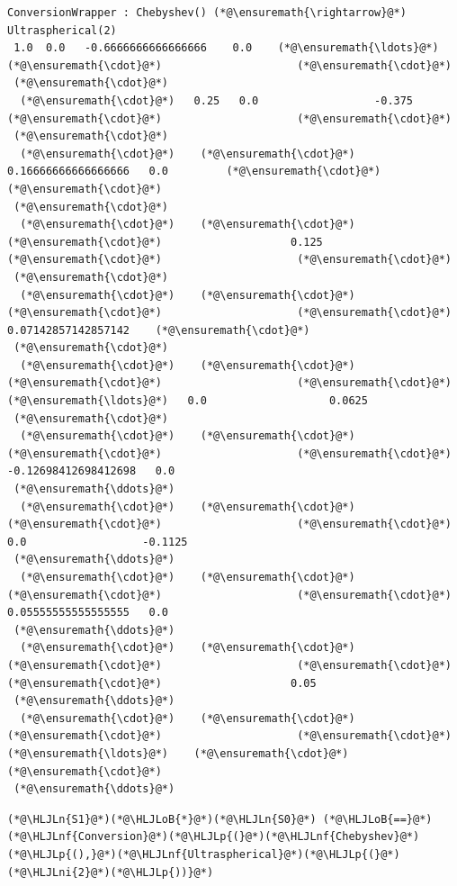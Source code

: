 \documentclass[12pt,a4paper]{article}
\newcommand{\HLJLn}[1]{#1}
\newcommand{\HLJLnf}[1]{\textcolor[RGB]{66,102,213}{#1}}
\newcommand{\HLJLni}[1]{\textcolor[RGB]{59,151,46}{#1}}
\newcommand{\HLJLoB}[1]{\textcolor[RGB]{102,102,102}{\textbf{#1}}}
\newcommand{\HLJLp}[1]{#1}
\begin{document}
\begin{lstlisting}
ConversionWrapper : Chebyshev() (*@\ensuremath{\rightarrow}@*) Ultraspherical(2)
 1.0  0.0   -0.6666666666666666    0.0    (*@\ensuremath{\ldots}@*)    (*@\ensuremath{\cdot}@*)                     (*@\ensuremath{\cdot}@*)     
 (*@\ensuremath{\cdot}@*)
  (*@\ensuremath{\cdot}@*)   0.25   0.0                  -0.375       (*@\ensuremath{\cdot}@*)                     (*@\ensuremath{\cdot}@*)     
 (*@\ensuremath{\cdot}@*)
  (*@\ensuremath{\cdot}@*)    (*@\ensuremath{\cdot}@*)     0.16666666666666666   0.0         (*@\ensuremath{\cdot}@*)                     (*@\ensuremath{\cdot}@*)     
 (*@\ensuremath{\cdot}@*)
  (*@\ensuremath{\cdot}@*)    (*@\ensuremath{\cdot}@*)      (*@\ensuremath{\cdot}@*)                    0.125       (*@\ensuremath{\cdot}@*)                     (*@\ensuremath{\cdot}@*)     
 (*@\ensuremath{\cdot}@*)
  (*@\ensuremath{\cdot}@*)    (*@\ensuremath{\cdot}@*)      (*@\ensuremath{\cdot}@*)                     (*@\ensuremath{\cdot}@*)         0.07142857142857142    (*@\ensuremath{\cdot}@*)     
 (*@\ensuremath{\cdot}@*)
  (*@\ensuremath{\cdot}@*)    (*@\ensuremath{\cdot}@*)      (*@\ensuremath{\cdot}@*)                     (*@\ensuremath{\cdot}@*)     (*@\ensuremath{\ldots}@*)   0.0                   0.0625 
 (*@\ensuremath{\cdot}@*)
  (*@\ensuremath{\cdot}@*)    (*@\ensuremath{\cdot}@*)      (*@\ensuremath{\cdot}@*)                     (*@\ensuremath{\cdot}@*)        -0.12698412698412698   0.0    
 (*@\ensuremath{\ddots}@*)
  (*@\ensuremath{\cdot}@*)    (*@\ensuremath{\cdot}@*)      (*@\ensuremath{\cdot}@*)                     (*@\ensuremath{\cdot}@*)         0.0                  -0.1125 
 (*@\ensuremath{\ddots}@*)
  (*@\ensuremath{\cdot}@*)    (*@\ensuremath{\cdot}@*)      (*@\ensuremath{\cdot}@*)                     (*@\ensuremath{\cdot}@*)         0.05555555555555555   0.0    
 (*@\ensuremath{\ddots}@*)
  (*@\ensuremath{\cdot}@*)    (*@\ensuremath{\cdot}@*)      (*@\ensuremath{\cdot}@*)                     (*@\ensuremath{\cdot}@*)          (*@\ensuremath{\cdot}@*)                    0.05   
 (*@\ensuremath{\ddots}@*)
  (*@\ensuremath{\cdot}@*)    (*@\ensuremath{\cdot}@*)      (*@\ensuremath{\cdot}@*)                     (*@\ensuremath{\cdot}@*)     (*@\ensuremath{\ldots}@*)    (*@\ensuremath{\cdot}@*)                     (*@\ensuremath{\cdot}@*)     
 (*@\ensuremath{\ddots}@*)
\end{lstlisting}


\begin{lstlisting}
(*@\HLJLn{S1}@*)(*@\HLJLoB{*}@*)(*@\HLJLn{S0}@*) (*@\HLJLoB{==}@*) (*@\HLJLnf{Conversion}@*)(*@\HLJLp{(}@*)(*@\HLJLnf{Chebyshev}@*)(*@\HLJLp{(),}@*)(*@\HLJLnf{Ultraspherical}@*)(*@\HLJLp{(}@*)(*@\HLJLni{2}@*)(*@\HLJLp{))}@*)
\end{lstlisting}
\end{document}

